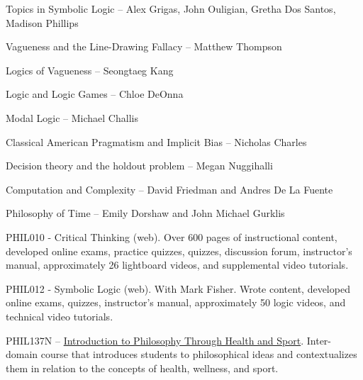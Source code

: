 \documentclass[p1noheader, 11pt, darkmode]{lightcv}
\begin{document}
\begin{rlist} 
\item Topics in Symbolic Logic -- Alex Grigas, John Ouligian, Gretha Dos Santos, Madison Phillips
\item Vagueness and the Line-Drawing Fallacy -- Matthew Thompson
\item Logics of Vagueness -- Seongtaeg Kang
\item Logic and Logic Games -- Chloe DeOnna
\item Modal Logic -- Michael Challis
\item Classical American Pragmatism and Implicit Bias -- Nicholas Charles
\item Decision theory and the holdout problem -- Megan Nuggihalli
\item Computation and Complexity -- David Friedman and Andres De La Fuente
\item Philosophy of Time -- Emily Dorshaw and John Michael Gurklis
\end{rlist}

\begin{rlist}    
    \item PHIL010 - Critical Thinking (web). Over 600 pages of instructional content, developed online exams, practice quizzes, quizzes, discussion forum, instructor’s manual, approximately
    26 lightboard videos, and supplemental video tutorials.
    \item PHIL012 - Symbolic Logic (web). With Mark Fisher. Wrote content, developed online exams, quizzes, instructor’s manual, approximately 50 logic videos, and technical video tutorials.
    \item PHIL137N – \href{https://bulletins.psu.edu/university-course-descriptions/undergraduate/phil/}{Introduction to Philosophy Through Health and Sport}. Inter-domain course that introduces students to philosophical ideas and contextualizes them in relation to the concepts of health, wellness, and sport.
\end{rlist}
\end{document}
